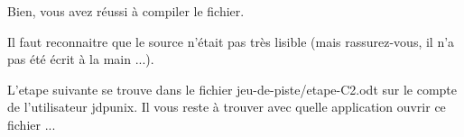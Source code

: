 \documentclass[a4paper]{article}
\newcommand{\Aa}[0]{z}
\newcommand{\Ab}[0]{a}
\newcommand{\Ac}[0]{b}
\newcommand{\Ad}[0]{c}
\newcommand{\Ae}[0]{d}
\newcommand{\Af}[0]{e}
\newcommand{\Ag}[0]{f}
\newcommand{\Ai}[0]{h}
\newcommand{\Aj}[0]{i}
\newcommand{\Ak}[0]{j}
\newcommand{\Am}[0]{l}
\newcommand{\An}[0]{m}
\newcommand{\Ao}[0]{n}
\newcommand{\Ap}[0]{o}
\newcommand{\Aq}[0]{p}
\newcommand{\Ar}[0]{q}
\newcommand{\As}[0]{r}
\newcommand{\At}[0]{s}
\newcommand{\Au}[0]{t}
\newcommand{\Av}[0]{u}
\newcommand{\Aw}[0]{v}
\newcommand{\Ay}[0]{x}
\begin{document}
B\Aj{}\Af{}\Ao{}, \Aw{}\Ap{}\Av{}\At{} \Ab{}\Aw{}\Af{}\Aa{} \As{}é\Av{}\At{}\At{}\Aj{} à \Ad{}\Ap{}\An{}\Aq{}\Aj{}\Am{}\Af{}\As{} \Am{}\Af{} \Ag{}\Aj{}\Ad{}\Ai{}\Aj{}\Af{}\As{}.

I\Am{} \Ag{}\Ab{}\Av{}\Au{} \As{}\Af{}\Ad{}\Ap{}\Ao{}\Ao{}\Ab{}\Aj{}\Au{}\As{}\Af{} \Ar{}\Av{}\Af{} \Am{}\Af{} \At{}\Ap{}\Av{}\As{}\Ad{}\Af{} \Ao{}'é\Au{}\Ab{}\Aj{}\Au{} \Aq{}\Ab{}\At{} \Au{}\As{}è\At{} \Am{}\Aj{}\At{}\Aj{}\Ac{}\Am{}\Af{} (\An{}\Ab{}\Aj{}\At{}
\As{}\Ab{}\At{}\At{}\Av{}\As{}\Af{}\Aa{}-\Aw{}\Ap{}\Av{}\At{}, \Aj{}\Am{} \Ao{}'\Ab{} \Aq{}\Ab{}\At{} é\Au{}é é\Ad{}\As{}\Aj{}\Au{} à \Am{}\Ab{} \An{}\Ab{}\Aj{}\Ao{} ...).

L'\Af{}\Au{}\Ab{}\Aq{}\Af{} \At{}\Av{}\Aj{}\Aw{}\Ab{}\Ao{}\Au{}\Af{} \At{}\Af{} \Au{}\As{}\Ap{}\Av{}\Aw{}\Af{} \Ae{}\Ab{}\Ao{}\At{} \Am{}\Af{} \Ag{}\Aj{}\Ad{}\Ai{}\Aj{}\Af{}\As{} \Ak{}\Af{}\Av{}-\Ae{}\Af{}-\Aq{}\Aj{}\At{}\Au{}\Af{}/\Af{}\Au{}\Ab{}\Aq{}\Af{}-C2.\Ap{}\Ae{}\Au{}
\At{}\Av{}\As{} \Am{}\Af{} \Ad{}\Ap{}\An{}\Aq{}\Au{}\Af{} \Ae{}\Af{} \Am{}'\Av{}\Au{}\Aj{}\Am{}\Aj{}\At{}\Ab{}\Au{}\Af{}\Av{}\As{} \Ak{}\Ae{}\Aq{}\Av{}\Ao{}\Aj{}\Ay{}. I\Am{} \Aw{}\Ap{}\Av{}\At{} \As{}\Af{}\At{}\Au{}\Af{} à \Au{}\As{}\Ap{}\Av{}\Aw{}\Af{}\As{} \Ab{}\Aw{}\Af{}\Ad{}
\Ar{}\Av{}\Af{}\Am{}\Am{}\Af{} \Ab{}\Aq{}\Aq{}\Am{}\Aj{}\Ad{}\Ab{}\Au{}\Aj{}\Ap{}\Ao{} \Ap{}\Av{}\Aw{}\As{}\Aj{}\As{} \Ad{}\Af{} \Ag{}\Aj{}\Ad{}\Ai{}\Aj{}\Af{}\As{} ...
\end{document}
